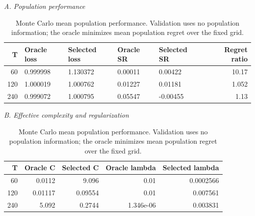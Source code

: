 \begin{table}[p]\centering\small
\caption{Monte Carlo mean population performance. Validation uses no population information; the oracle minimizes mean population regret over the fixed grid.}
\label{tab:sim_main}
\textit{A. Population performance}\par\smallskip
\begin{tabular}{rllllr}
\toprule
T & Oracle loss & Selected loss & Oracle SR & Selected SR & Regret ratio \\
\midrule
60 & 0.999998 & 1.130372 & 0.00011 & 0.00422 & 10.17 \\
120 & 1.000019 & 1.000762 & 0.01227 & 0.01181 & 1.052 \\
240 & 0.999072 & 1.000795 & 0.05547 & -0.00455 & 1.13 \\
\bottomrule
\end{tabular}
\par\medskip
\textit{B. Effective complexity and regularization}\par\smallskip
\begin{tabular}{rrrrr}
\toprule
T & Oracle C & Selected C & Oracle lambda & Selected lambda \\
\midrule
60 & 0.0112 & 9.096 & 0.01 & 0.0002566 \\
120 & 0.01117 & 0.09554 & 0.01 & 0.007561 \\
240 & 5.092 & 0.2744 & 1.346e-06 & 0.003831 \\
\bottomrule
\end{tabular}
\par\medskip
\end{table}
